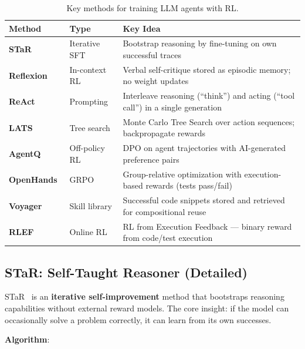 \begin{table}[ht!]
\centering
\caption{Key methods for training LLM agents with RL.}
\begin{tabular}{@{}lp{5cm}p{8cm}@{}}
\toprule
\textbf{Method} & \textbf{Type} & \textbf{Key Idea} \\
\midrule
\textbf{STaR}~\cite{zelikman2022star} & Iterative SFT & Bootstrap reasoning by fine-tuning on own successful traces \\
\textbf{Reflexion}~\cite{shinn2023reflexion} & In-context RL & Verbal self-critique stored as episodic memory; no weight updates \\
\textbf{ReAct}~\cite{yao2023react} & Prompting & Interleave reasoning (``think'') and acting (``tool call'') in a single generation \\
\textbf{LATS}~\cite{zhou2024lats} & Tree search & Monte Carlo Tree Search over action sequences; backpropagate rewards \\
\textbf{AgentQ}~\cite{putta2024agentq} & Off-policy RL & DPO on agent trajectories with AI-generated preference pairs \\
\textbf{OpenHands}~\cite{wang2024openhands} & GRPO & Group-relative optimization with execution-based rewards (tests pass/fail) \\
\textbf{Voyager}~\cite{wang2023voyager} & Skill library & Successful code snippets stored and retrieved for compositional reuse \\
\textbf{RLEF}~\cite{le2024rlef} & Online RL & RL from Execution Feedback --- binary reward from code/test execution \\
\bottomrule
\end{tabular}
\end{table}

\subsection{STaR: Self-Taught Reasoner (Detailed)}
\label{star-self-taught-reasoner-detailed}

STaR~\cite{zelikman2022star} is an \textbf{iterative self-improvement} method that bootstraps reasoning capabilities without external reward models. The core insight: if the model can occasionally solve a problem correctly, it can learn from its own successes.

\textbf{Algorithm}:

